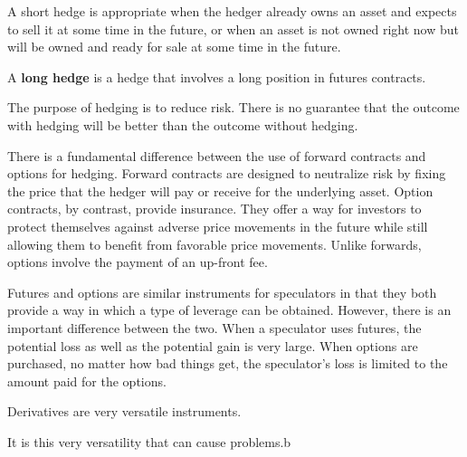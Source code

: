 A short hedge is appropriate when the hedger already owns an asset and expects to sell it at some time in the
future, or when an asset is not owned right now but will be owned and ready for sale at some time in the future.

A \textbf{long hedge} is a hedge that involves a long position in futures contracts.
\ed

The purpose of hedging is to reduce risk. There is no guarantee that the outcome with hedging will be better than the
outcome without hedging.

There is a fundamental difference between the use of forward contracts and options for hedging. Forward contracts
are designed to neutralize risk by fixing the price that the hedger will pay or receive for the underlying asset.
Option contracts, by contrast, provide insurance. They offer a way for investors to protect themselves against
adverse price movements in the future while still allowing them to benefit from favorable price movements. Unlike
forwards, options involve the payment of an up-front fee.

Futures and options are similar instruments for speculators in that they both provide a way in which a type of
leverage can be obtained. However, there is an important difference between the two. When a speculator uses futures,
the potential loss as well as the potential gain is very large. When options are purchased, no matter how bad things
get, the speculator's loss is limited to the amount paid for the options.

Derivatives are very versatile instruments.

It is this very versatility that can cause problems.b